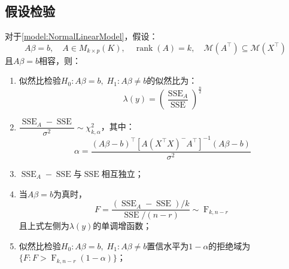 \subsection{假设检验}
\begin{theorem}\label{theo:NormalLinearModelHypothesisTesting}
	对于\cref{model:NormalLinearModel}，假设：
	\begin{equation*}
		A\beta=b,\quad A\in M_{k\times p}(K),\quad\operatorname{rank}(A)=k,\quad\mathcal{M}(A^{\top})\subseteq\mathcal{M}(X^{\top})
	\end{equation*}
	且$A\beta=b$相容，则：
	\begin{enumerate}
		\item 似然比检验$H_0:A\beta=b,\;H_1:A\beta\ne b$的似然比为：
		\begin{equation*}
			\lambda(y)=\left(\frac{\operatorname{SSE}_A}{\operatorname{SSE}}\right)^\frac{n}{2}
		\end{equation*}
		\item $\dfrac{\operatorname{SSE}_A-\operatorname{SSE}}{\sigma^2}\sim\chi^2_{k,\alpha}$，其中：
		\begin{equation*}
			\alpha=\frac{(A\beta-b)^{\top}[A(X^{\top}X)^-A^{\top}]^{-1}(A\beta-b)}{\sigma^2}
		\end{equation*}
		\item $\operatorname{SSE}_A-\operatorname{SSE}$与$\operatorname{SSE}$相互独立；
		\item 当$A\beta=b$为真时，
		\begin{equation*}
			F=\frac{(\operatorname{SSE}_A-\operatorname{SSE})/k}{\operatorname{SSE}/(n-r)}\sim\operatorname{F}_{k,n-r}
		\end{equation*}
		且上式左侧为$\lambda(y)$的单调增函数；
		\item 似然比检验$H_0:A\beta=b,\;H_1:A\beta\ne b$置信水平为$1-\alpha$的拒绝域为$\{F:F>\operatorname{F}_{k,n-r}(1-\alpha)\}$；
	\end{enumerate}
\end{theorem}
